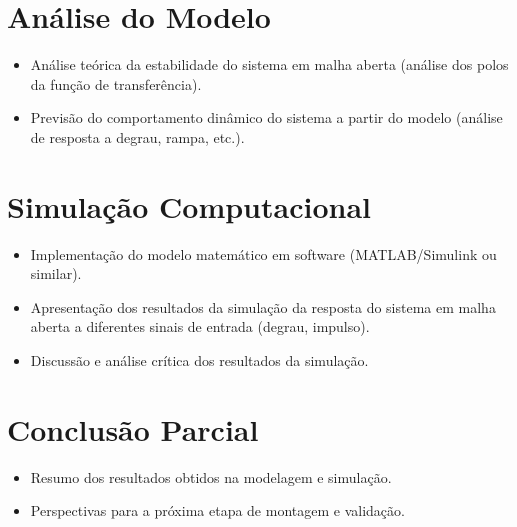 \documentclass[9pt,a4paper,twocolumn,twoside]{tau-class/tau}
\begin{document}
\section{Análise do Modelo}
\begin{itemize}
    \item Análise teórica da estabilidade do sistema em malha aberta (análise dos polos da função de transferência).
    \item Previsão do comportamento dinâmico do sistema a partir do modelo (análise de resposta a degrau, rampa, etc.).
\end{itemize}

\section{Simulação Computacional}
\begin{itemize}
    \item Implementação do modelo matemático em software (MATLAB/Simulink ou similar).
    \item Apresentação dos resultados da simulação da resposta do sistema em malha aberta a diferentes sinais de entrada (degrau, impulso).
    \item Discussão e análise crítica dos resultados da simulação.
\end{itemize}

\section{Conclusão Parcial}
\begin{itemize}
    \item Resumo dos resultados obtidos na modelagem e simulação.
    \item Perspectivas para a próxima etapa de montagem e validação.
\end{itemize}


    
    
    
\end{document}
